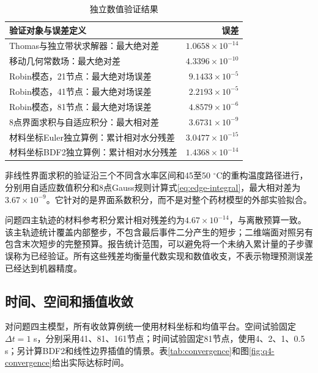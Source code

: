 \begin{table}[htbp]
\centering\caption{独立数值验证结果}\label{tab:solver-validation}
\begin{tabular}{lr}\toprule
验证对象与误差定义 & 误差\\\midrule
Thomas与独立带状求解器：最大绝对差 & $1.0658\times10^{-14}$\\
移动几何常数场：最大绝对差 & $4.3396\times10^{-10}$\\
Robin模态，21节点：最大绝对场误差 & $9.1433\times10^{-5}$\\
Robin模态，41节点：最大绝对场误差 & $2.2193\times10^{-5}$\\
Robin模态，81节点：最大绝对场误差 & $4.8579\times10^{-6}$\\
8点界面求积与自适应积分：最大相对差 & $3.6731\times10^{-9}$\\
材料坐标Euler独立算例：累计相对水分残差 & $3.0477\times10^{-15}$\\
材料坐标BDF2独立算例：累计相对水分残差 & $1.4368\times10^{-14}$\\\bottomrule
\end{tabular}
\end{table}

非线性界面求积的验证沿三个不同含水率区间和45至50 $^\circ$C的重构温度路径进行，分别用自适应数值积分和8点Gauss规则计算式\eqref{eq:edge-integral}，最大相对差为$3.67\times10^{-9}$。它针对的是界面系数积分，而不是对整个药材模型的外部实验拟合。

问题四主轨迹的材料参考积分累计相对残差约为$4.67\times10^{-14}$，与离散预算一致。该主轨迹统计覆盖内部整步，不包含最后事件二分产生的短步；二维端面对照另有包含末次短步的完整预算。报告统计范围，可以避免将一个未纳入累计量的子步骤误称为已经验证。所有这些残差均衡量代数实现和数值收支，不表示物理预测误差已经达到机器精度。

\subsection{时间、空间和插值收敛}\label{sec:convergence}
对问题四主模型，所有收敛算例统一使用材料坐标和均值平台。空间试验固定$\Delta t=1$ s，分别采用41、81、161节点；时间试验固定81节点，使用4、2、1、0.5 s；另计算BDF2和线性边界插值的情景。表\ref{tab:convergence}和图\ref{fig:q4-convergence}给出实际达标时间。

